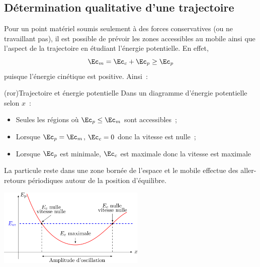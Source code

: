 \documentclass[../../main/main.tex]{subfiles}
\begin{document}
\subsection{Détermination qualitative d'une trajectoire}
Pour un point matériel soumis seulement à des forces conservatives (ou ne
travaillant pas), il est possible de prévoir les zones accessibles au mobile
ainsi que l'aspect de la trajectoire en étudiant l'énergie potentielle. En
effet,
\[\Ec_m = \Ec_c + \Ec_p \geq \Ec_p\]
puisque l'énergie cinétique est positive. Ainsi~:
\begin{tcb*}(ror){Trajectoire et énergie potentielle}
	Dans un diagramme d'énergie potentielle selon $x$~:
	\begin{itemize}
		\item Seules les régions où $\Ec_p \leq \Ec_m$ sont accessibles~;
		\item Lorsque $\Ec_p = \Ec_m$, $\Ec_c = 0$ donc la vitesse est nulle~;
		\item Lorsque $\Ec_p$ est minimale, $\Ec_c$ est maximale donc la vitesse
		      est maximale
	\end{itemize}\bigbreak
	\begin{minipage}{0.47\linewidth}
		\begin{center}
			\bfseries
		\end{center}
		La particule reste dans une zone bornée de l’espace et le mobile effectue
		des aller-retours périodiques autour de la position d’équilibre.
		\begin{center}
			\includegraphics[width=7cm]{stab_lie}
		\end{center}
	\end{minipage}
	\hfill
	\begin{minipage}{0.47\linewidth}
		\begin{center}

\end{center}
\end{minipage}
\end{tcb*}
\end{document}
